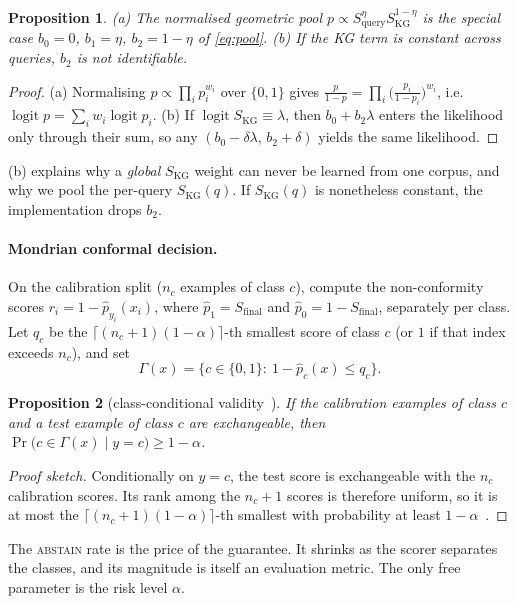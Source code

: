 \documentclass[10pt,twocolumn]{article}
\newtheorem{proposition}{Proposition}
\theoremstyle{remark}
\DeclareMathOperator{\logit}{logit}
\newcommand{\SKGq}{S_{\mathrm{KG}}(q)}
\begin{document}
\begin{proposition}\label{prop:pool}
(a) The normalised geometric pool $p\propto S_{\mathrm{query}}^{\eta}S_{\mathrm{KG}}^{1-\eta}$ is the special case
$b_0=0$, $b_1=\eta$, $b_2=1-\eta$ of \cref{eq:pool}. (b) If the KG term is constant across queries, $b_2$ is not
identifiable.
\end{proposition}
\begin{proof}
(a) Normalising $p\propto\prod_i p_i^{w_i}$ over $\{0,1\}$ gives
$\frac{p}{1-p}=\prod_i\big(\frac{p_i}{1-p_i}\big)^{w_i}$, i.e.\ $\logit p=\sum_i w_i\logit p_i$. (b) If
$\logit S_{\mathrm{KG}}\equiv\lambda$, then $b_0+b_2\lambda$ enters the likelihood only through their sum, so any
$(b_0-\delta\lambda,\,b_2+\delta)$ yields the same likelihood.
\end{proof}
(b) explains why a \emph{global} $S_{\mathrm{KG}}$ weight can never be learned from one corpus, and why
we pool the per-query $\SKGq$. If $\SKGq$ is nonetheless constant, the implementation drops $b_2$.

\paragraph{Mondrian conformal decision.}
On the calibration split ($n_c$ examples of class $c$), compute the non-conformity scores
$r_i=1-\hat p_{y_i}(x_i)$, where $\hat p_1=S_{\mathrm{final}}$ and $\hat p_0=1-S_{\mathrm{final}}$, separately per class.
Let $q_c$ be the $\lceil(n_c+1)(1-\alpha)\rceil$-th smallest score of class $c$ (or $1$ if that index exceeds $n_c$),
and set
\begin{equation}
\Gamma(x)=\{c\in\{0,1\}:\ 1-\hat p_c(x)\le q_c\}.
\end{equation}
\begin{proposition}[class-conditional validity~\cite{vovk2012conditional}]
If the calibration examples of class $c$ and a test example of class $c$ are exchangeable, then
$\Pr\big(c\in\Gamma(x)\mid y=c\big)\ge1-\alpha$.
\end{proposition}
\begin{proof}[Proof sketch]
Conditionally on $y=c$, the test score is exchangeable with the $n_c$ calibration scores. Its rank among the $n_c+1$
scores is therefore uniform, so it is at most the $\lceil(n_c+1)(1-\alpha)\rceil$-th smallest with probability at
least $1-\alpha$~\cite{lei2018distribution,angelopoulos2023gentle}.
\end{proof}
The \textsc{abstain} rate is the price of the guarantee. It shrinks as the scorer separates the classes, and its
magnitude is itself an evaluation metric. The only free parameter is the risk level $\alpha$.
\end{document}

